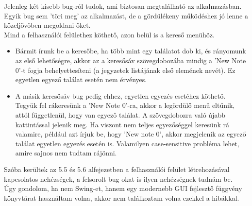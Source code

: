 Jelenleg két kisebb bug-ról tudok, ami biztosan megtalálható az alkalmazásban. Egyik bug sem 'töri meg' az alkalmazást, de a gördülékeny működéshez jó lenne a közeljövőben megoldani őket.
\\ Mind a felhasználói felülethez köthető, azon belül is a kereső menühöz.
\begin{itemize}
	\item Bármit írunk be a keresőbe, ha több mint egy találatot dob ki, és rányomunk az első lehetőségre, akkor az a keresősáv szövegdobozába mindig a 'New Note 0'-t fogja behelyettesíteni (a jegyzetek listájának első elemének nevét). Ez egyetlen egyező találat esetén nem érvényes.
	\item A másik keresősáv bug pedig ehhez, egyetlen egyezés esetéhez köthető. Tegyük fel rákeresünk a 'New Note 0'-ra, akkor a legördülő menü eltűnik, attól függetlenül, hogy van egyező találat. A szövegdobozra való újabb kattintással jelenik meg. Ha viszont nem teljes egyezőséggel keresünk rá valamire, például azt írjuk be, hogy 'New note 0', akkor megjelenik az egyező találat egyetlen egyezés esetén is. Valamilyen case-sensitive probléma lehet, amire sajnos nem tudtam rájönni.
	
\end{itemize}
\noindent Szóba kerültek az 5.5 és 5.6 alfejezetben a felhasználói felület létrehozásával kapcsolatos nehézségek, a felsorolt bug-okat is ilyen nehézségnek tudnám be. 
\\Úgy gondolom, ha nem Swing-et, hanem egy modernebb GUI fejlesztő függvény könyvtárat használtam volna, akkor nem találkoztam volna ezekkel a hibákkal.